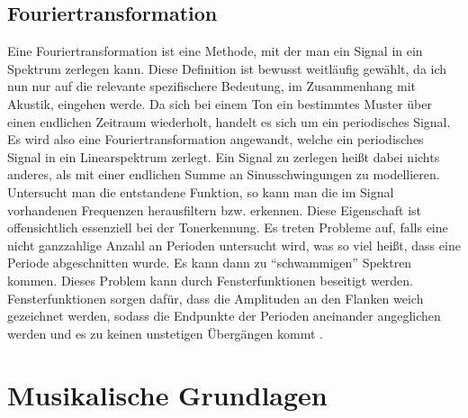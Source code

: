 \subsection{Fouriertransformation}
\label{sec:Fouriertransformation}
Eine Fouriertransformation ist eine Methode, mit der man ein Signal in ein Spektrum zerlegen kann. Diese Definition ist bewusst weitläufig gewählt, da ich nun nur auf die relevante spezifischere Bedeutung, im Zusammenhang mit Akustik, eingehen werde.
Da sich bei einem Ton ein bestimmtes Muster über einen endlichen Zeitraum wiederholt, handelt es sich um ein periodisches Signal. Es wird also eine Fouriertransformation angewandt, welche ein
periodisches Signal in ein Linearspektrum zerlegt. Ein Signal zu zerlegen heißt dabei nichts anderes, als mit einer endlichen Summe an Sinusschwingungen zu modellieren. Untersucht man die entstandene Funktion, so kann man die im Signal vorhandenen Frequenzen 
herausfiltern bzw. erkennen. Diese Eigenschaft ist offensichtlich essenziell bei der Tonerkennung. Es treten Probleme auf, falls eine nicht ganzzahlige Anzahl an Perioden untersucht wird, was so viel heißt, dass eine Periode abgeschnitten wurde. Es kann dann zu ``schwammigen'' Spektren kommen.
Dieses Problem kann durch Fensterfunktionen beseitigt werden. Fensterfunktionen sorgen dafür, dass die Amplituden an den Flanken weich gezeichnet werden, sodass die Endpunkte der Perioden aneinander angeglichen werden und es zu keinen unstetigen Übergängen kommt \cite{Butz2006}.

\section{Musikalische Grundlagen}
